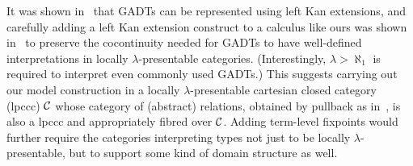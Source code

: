 \documentclass[runningheads]{llncs}
\newcommand{\set}{\mathsf{Set}}
\begin{document}
It was shown in~\cite{jg08} that GADTs can be represented using
left Kan extensions, and
%
%
carefully adding a
left Kan extension construct to a calculus like ours was shown
in~\cite{jp19} to preserve the cocontinuity needed for GADTs to have
well-defined interpretations in locally $\lambda$-presentable
categories. (Interestingly,
$\lambda > \aleph_1$ is required to interpret even commonly used
GADTs.) This suggests
carrying out our model construction in a locally $\lambda$-presentable
cartesian closed category (lpccc) $\cal C$ whose category of
(abstract) relations, obtained by pullback as in~\cite{jac99},
is also a lpccc and appropriately fibred over $\cal C$.
Adding term-level fixpoints 
would further require the categories interpreting types not just to be
locally $\lambda$-presentable, but to support some kind of domain
structure as well.

\noindent

\end{document}
